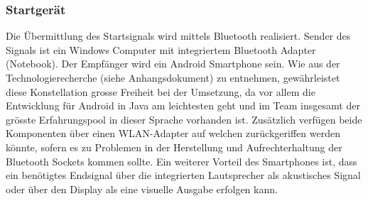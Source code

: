 \subsubsection{Startgerät}
Die Übermittlung des Startsignals wird mittels Bluetooth realisiert. 
Sender des Signals ist ein Windows Computer mit integriertem Bluetooth Adapter (Notebook). Der Empfänger wird ein Android Smartphone sein.
Wie aus der Technologierecherche (siehe Anhangsdokument) zu entnehmen, gewährleistet diese Konstellation grosse Freiheit bei der Umsetzung, 
da vor allem die Entwicklung für Android in Java am leichtesten geht und im Team insgesamt der grösste Erfahrungspool in dieser Sprache vorhanden ist. Zusätzlich verfügen beide Komponenten über einen WLAN-Adapter auf welchen zurückgeriffen werden könnte, sofern es zu Problemen in der Herstellung und Aufrechterhaltung der Bluetooth Sockets kommen sollte.
Ein weiterer Vorteil des Smartphones ist, dass ein benötigtes Endsignal über die integrierten Lautsprecher 
als akustisches Signal oder über den Display als eine visuelle Ausgabe erfolgen kann.
